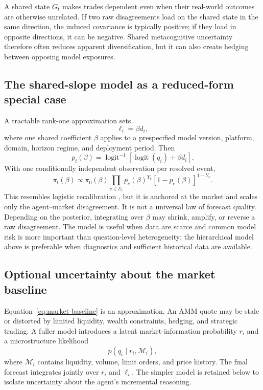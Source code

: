 \documentclass[journal,a4paper]{IEEEtran}
\newcommand{\sigmoid}{\operatorname{logit}^{-1}}
\newcommand{\logit}{\operatorname{logit}}
\begin{document}
A shared state $G_t$ makes trades dependent even when their real-world outcomes are otherwise unrelated. If two raw disagreements load on the shared state in the same direction, the induced covariance is typically positive; if they load in opposite directions, it can be negative. Shared metacognitive uncertainty therefore often reduces apparent diversification, but it can also create hedging between opposing model exposures.

\subsection{The shared-slope model as a reduced-form special case}
A tractable rank-one approximation sets
\begin{equation}
\ell_i=\beta d_i,
\label{eq:rank-one-evidence}
\end{equation}
where one shared coefficient $\beta$ applies to a prespecified model version, platform, domain, horizon regime, and deployment period. Then
\begin{equation}
p_i(\beta)
=
\sigmoid\!\left[\logit(q_i)+\beta d_i\right].
\label{eq:shared-beta-model}
\end{equation}
With one conditionally independent observation per resolved event,
\begin{equation}
\pi_t(\beta)
\propto
\pi_0(\beta)
\prod_{e\in\mathcal{E}_t}
 p_e(\beta)^{Y_e}
 [1-p_e(\beta)]^{1-Y_e}.
\label{eq:beta-posterior}
\end{equation}
This resembles logistic recalibration \cite{cox1958,dawid1982}, but it is anchored at the market and scales only the agent--market disagreement. It is not a universal law of forecast quality. Depending on the posterior, integrating over $\beta$ may shrink, amplify, or reverse a raw disagreement. The model is useful when data are scarce and common model risk is more important than question-level heterogeneity; the hierarchical model above is preferable when diagnostics and sufficient historical data are available.

\subsection{Optional uncertainty about the market baseline}
Equation~\eqref{eq:market-baseline} is an approximation. An AMM quote may be stale or distorted by limited liquidity, wealth constraints, hedging, and strategic trading. A fuller model introduces a latent market-information probability $r_i$ and a microstructure likelihood
\begin{equation}
p(q_i\mid r_i,\mathcal{M}_i),
\end{equation}
where $\mathcal{M}_i$ contains liquidity, volume, limit orders, and price history. The final forecast integrates jointly over $r_i$ and $\ell_i$. The simpler model is retained below to isolate uncertainty about the agent's incremental reasoning.
\end{document}
